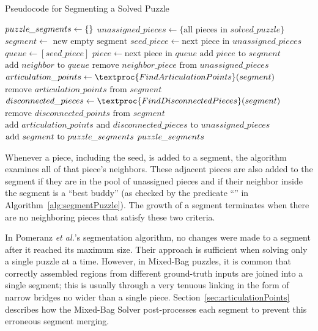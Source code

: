 \begin{algorithm}[tb]
\caption{Pseudocode for Segmenting a Solved Puzzle}\label{alg:segmentPuzzle}
\begin{algorithmic}[1]
    \State $puzzle\hspace{-0.8pt}\_segments \gets \{ \}$
    \State $unassigned\_pieces \gets \{ \text{all pieces in } solved\_puzzle \}$
        \State $segment \gets \text{ new empty segment}$
        \State $seed\_piece \gets \text{next piece in } unassigned\_pieces$
        \State $queue \gets [seed\_piece]$
            \State $piece \gets \text{next piece in } queue$
            \State $\text{add } piece \text{ to } segment$
            		\State $\text{add } neighbor \text{ to } queue$
            		\State $\text{remove } neighbor\_piece \text{ from } unassigned\_pieces$
            	\EndIf
            \EndFor
        \EndWhile
        \State $articulation\_points \gets \textproc{FindArticulationPoints}(segment)$
        \State $\text{remove } articulation\_points \text{ from } \textit{segment}$
		\State $disconnected\_pieces \gets \textproc{FindDisconnectedPieces}(segment)$ 
		\State $\text{remove } disconnected\_points \text{ from } segment$
        \State $\text{add } \textit{articulation\_points} \text{ and } \textit{disconnected\_pieces} \text{ to } \textit{unassigned\_pieces}$               	
		\State $\text{add } segment \text{ to } puzzle\hspace{-0.8pt}\_segments$	
    \EndWhile
    \State \Return $puzzle\hspace{-0.8pt}\_segments$
\EndFunction
\end{algorithmic}
\end{algorithm}

Whenever a piece, including the seed, is added to a segment, the algorithm examines all of that piece's neighbors.  These adjacent pieces are also added to the segment if they are in the pool of unassigned pieces and if their neighbor inside the segment is a ``best buddy'' (as checked by the predicate ``'' in Algorithm~\ref{alg:segmentPuzzle}).  The growth of a segment terminates when there are no neighboring pieces that satisfy these two criteria. 

In Pomeranz \textit{et al.}'s segmentation algorithm, no changes were made to a segment after it reached its maximum size.  Their approach is sufficient when solving only a single puzzle at a time.  However, in Mixed-Bag puzzles, it is common that correctly assembled regions from different ground-truth inputs are joined into a single segment; this is usually through a very tenuous linking in the form of narrow bridges no wider than a single piece.  Section~\ref{sec:articulationPoints} describes how the Mixed-Bag Solver post-processes each segment to prevent this erroneous segment merging.

